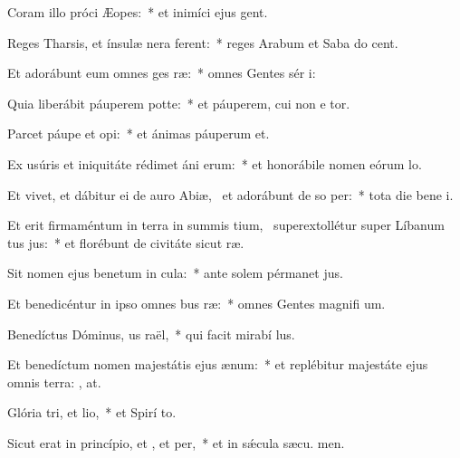 \item Coram illo próci Æopes:~* et inimíci ejus  gent.
\item Reges Tharsis, et ínsulæ nera ferent:~* reges Arabum et Saba do cent.
\item Et adorábunt eum omnes ges ræ:~* omnes Gentes sér i:
\item Quia liberábit páuperem  potte:~* et páuperem, cui non e tor.
\item Parcet páupe et opi:~* et ánimas páuperum  et.
\item Ex usúris et iniquitáte rédimet áni erum:~* et honorábile nomen eórum  lo.
\item Et vivet, et dábitur ei de auro Abiæ,~\pscross{} et adorábunt de so per:~* tota die bene i.
\item Et erit firmaméntum in terra in summis tium,~\pscross{} superextollétur super Líbanum tus jus:~* et florébunt de civitáte sicut  ræ.
\item Sit nomen ejus benetum in cula:~* ante solem pérmanet  jus.
\item Et benedicéntur in ipso omnes bus ræ:~* omnes Gentes magnifi um.
\item Benedíctus Dóminus, us raël,~* qui facit mirabí lus.
\item Et benedíctum nomen majestátis ejus  ænum:~* et replébitur majestáte ejus omnis terra: , at.
\item Glória tri, et lio,~* et Spirí to.
\item Sicut erat in princípio, et , et per,~* et in sǽcula sæcu. men.
